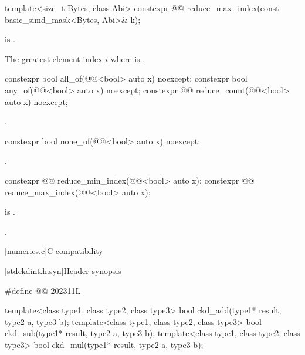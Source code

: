 \begin{itemdecl}
template<size_t Bytes, class Abi>
  constexpr @@ reduce_max_index(const basic_simd_mask<Bytes, Abi>& k);
\end{itemdecl}

\begin{itemdescr}
\pnum
\expects
{} is .

\pnum
\returns
The greatest element index $i$ where  is .
\end{itemdescr}

\begin{itemdecl}
constexpr bool all_of(@@<bool> auto x) noexcept;
constexpr bool any_of(@@<bool> auto x) noexcept;
constexpr @@ reduce_count(@@<bool> auto x) noexcept;
\end{itemdecl}

\begin{itemdescr}
\pnum
\returns
{}.
\end{itemdescr}

\begin{itemdecl}
constexpr bool none_of(@@<bool> auto x) noexcept;
\end{itemdecl}

\begin{itemdescr}
\pnum
\returns
{}.
\end{itemdescr}

\begin{itemdecl}
constexpr @@ reduce_min_index(@@<bool> auto x);
constexpr @@ reduce_max_index(@@<bool> auto x);
\end{itemdecl}

\begin{itemdescr}
\pnum
\expects
{} is .

\pnum
\returns
{}.
\end{itemdescr}

[numerics.c]{C compatibility}

[stdckdint.h.syn]{Header  synopsis}

%
\begin{codeblock}
#define @@ 202311L

template<class type1, class type2, class type3>
  bool ckd_add(type1* result, type2 a, type3 b);
template<class type1, class type2, class type3>
  bool ckd_sub(type1* result, type2 a, type3 b);
template<class type1, class type2, class type3>
  bool ckd_mul(type1* result, type2 a, type3 b);
\end{codeblock}

